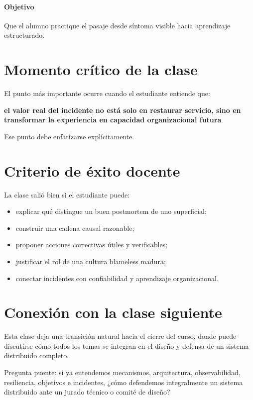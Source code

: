 \documentclass[variant=docente,cover=institutional,mode=screen]{ua-engineering-v6-article}
\begin{document}
\paragraph{Objetivo}
Que el alumno practique el pasaje desde síntoma visible hacia aprendizaje estructurado.

\section{Momento crítico de la clase}

El punto más importante ocurre cuando el estudiante entiende que:

\begin{center}
\textbf{el valor real del incidente no está solo en restaurar servicio, sino en transformar la experiencia en capacidad organizacional futura}
\end{center}

Ese punto debe enfatizarse explícitamente.

\section{Criterio de éxito docente}

La clase salió bien si el estudiante puede:

\begin{itemize}
\item explicar qué distingue un buen postmortem de uno superficial;
\item construir una cadena causal razonable;
\item proponer acciones correctivas útiles y verificables;
\item justificar el rol de una cultura blameless madura;
\item conectar incidentes con confiabilidad y aprendizaje organizacional.
\end{itemize}

\section{Conexión con la clase siguiente}

Esta clase deja una transición natural hacia el cierre del curso, donde puede discutirse cómo todos los temas se integran en el diseño y defensa de un sistema distribuido completo.

\begin{uakeybox}
Pregunta puente: si ya entendemos mecanismos, arquitectura, observabilidad, resiliencia, objetivos e incidentes, ¿cómo defendemos integralmente un sistema distribuido ante un jurado técnico o comité de diseño?
\end{uakeybox}
\end{document}

